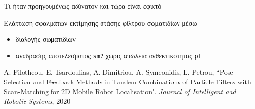 \begin{frame}{Τι ήταν προηγουμένως αδύνατον και τώρα είναι εφικτό}

  \vspace{2cm}
  Ελάττωση σφαλμάτων εκτίμησης στάσης φίλτρου σωματιδίων μέσω

  \begin{itemize}
    \item διαλογής σωματιδίων
    \item ανάδρασης αποτελέσματος \texttt{sm2} χωρίς απώλεια ανθεκτικότητας \texttt{pf}
  \end{itemize}



  \placebottom
  \tiny A. Filotheou, E. Tsardoulias, A. Dimitriou, A. Symeonidis, L. Petrou, ``Pose Selection and Feedback Methods in Tandem Combinations of Particle Filters with Scan-Matching for 2D Mobile Robot Localisation". \textit{Journal of Intelligent and Robotic Systems}, 2020

\end{frame}
